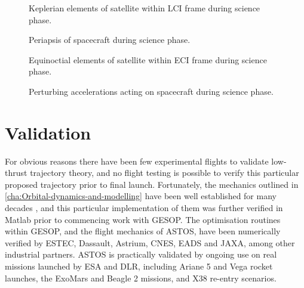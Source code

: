 \begin{figure}
\centering
\def\svgwidth{\figurewidth}

\caption{Keplerian elements of satellite within LCI frame during science phase.} \label{fig:Science-kep-lci}
\end{figure}

\begin{figure}
\centering
\def\svgwidth{\figurewidth}

\caption{Periapsis of spacecraft during science phase.} \label{fig:Science-peri}
\end{figure}

\begin{figure}
\centering
\def\svgwidth{\figurewidth}

\caption{Equinoctial elements of satellite within ECI frame during science phase.} \label{fig:Science-mee}
\end{figure}

\begin{figure}
\centering
\def\svgwidth{\figurewidth}

\caption{Perturbing accelerations acting on spacecraft during science phase.} \label{fig:Science-pert}
\end{figure}

%


\clearpage


\section{Validation} \label{sec:Validation}
For obvious reasons there have been few experimental flights to validate low-thrust trajectory theory, and no flight testing is possible to verify this particular proposed trajectory prior to final launch. Fortunately, the mechanics outlined in \autoref{cha:Orbital-dynamics-and-modelling} have been well established for many decades \parencite{Kaplan1976}, and this particular implementation of them was further verified in Matlab prior to commencing work with GESOP. The optimisation routines within GESOP, and the flight mechanics of ASTOS, have been numerically verified by ESTEC, Dassault, Astrium, CNES, EADS and JAXA, among other industrial partners. ASTOS is practically validated by ongoing use on real missions launched by ESA and DLR, including Ariane 5 and Vega rocket launches, the ExoMars and Beagle 2 missions, and X38 re-entry scenarios.

